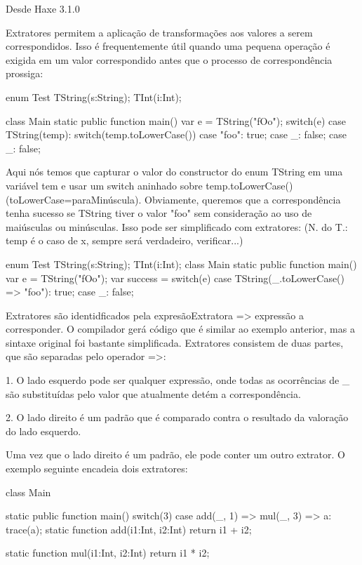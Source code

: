 {Desde Haxe 3.1.0

Extratores permitem a aplicação de transformações aos valores a serem correspondidos. Isso é frequentemente útil quando uma pequena operação é exigida em um valor correspondido antes que o processo de correspondência prossiga:

enum Test {
   TString(s:String);
   TInt(i:Int);
}

class Main {
     static public function main() {
          var e = TString("fOo");
          switch(e) {
              case TString(temp):
              switch(temp.toLowerCase()) {
                   case "foo": true;
                   case _: false;
              }    
              case _: false;
          }
     }
}

Aqui nós temos que capturar o valor do constructor do enum TString em uma variável tem e usar um switch aninhado sobre temp.toLowerCase() (toLowerCase=paraMinúscula). Obviamente, queremos que a correspondência tenha sucesso se TString tiver o valor "foo" sem consideração ao uso de maiúsculas ou minúsculas. Isso pode ser simplificado com extratores:
(N. do T.: temp é o caso de x, sempre será verdadeiro, verificar...)

enum Test {
    TString(s:String);
    TInt(i:Int);
}
class Main {
    static public function main() {
    var e = TString("fOo");
    var success = switch(e) {
        case TString(_.toLowerCase() => "foo"): true;
        case _: false;
        }  
    }
}

Extratores são identidficados pela expresãoExtratora => expressão a corresponder. O compilador gerá código que é similar ao exemplo anterior, mas a sintaxe original foi bastante simplificada. Extratores consistem de duas partes, que são separadas pelo operador =>:

1. O lado esquerdo pode ser qualquer expressão, onde todas as ocorrências de _ são substituídas pelo valor que atualmente detém a correspondência.

2. O lado direito é um padrão que é comparado contra o resultado da valoração do lado esquerdo.

Uma vez que o lado direito é um padrão, ele pode conter um outro extrator. O exemplo seguinte encadeia dois extratores:

class Main {
    static public function main() {
        switch(3) {
            case add(_, 1) => mul(_, 3) => a: trace(a);
        }
    }
    static function add(i1:Int, i2:Int) {
        return i1 + i2;
    }

    static function mul(i1:Int, i2:Int) {
        return i1 * i2;
    }
}

}
